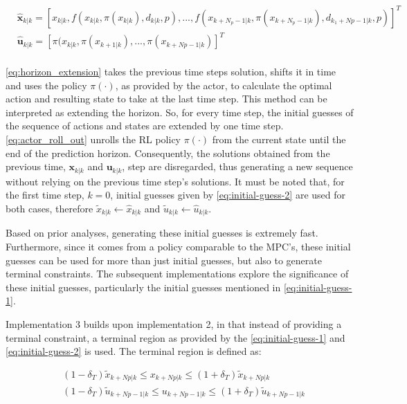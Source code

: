 \begin{equation}\label{eq:actor_roll_out}
	\begin{aligned}
		&\hat{\mathbf{x}}_{k|k} = [x_{k|k},f(x_{k|k},\pi(x_{k|k}),d_{k|k},p),..., f(x_{k+N_p-1|k}, \pi(x_{k + N_p-1|k}), d_{k_1 + Np-1|k},p)]^T \\ 
		&\hat{\mathbf{u}}_{k|k} = [\pi(x_{k|k},\pi(x_{k+1|k}),...,\pi(x_{k+Np-1|k})]^T \\ 
	\end{aligned}
\end{equation}

\autoref{eq:horizon_extension} takes the previous time steps solution, shifts it in time and uses the policy $\pi(\cdot)$, as provided by the actor, to calculate the optimal action and resulting state to take at the last time step. This method can be interpreted as extending the horizon. So, for every time step, the initial guesses of the sequence of actions and states are extended by one time step. \autoref{eq:actor_roll_out} unrolls the RL policy $\pi(\cdot)$ from the current state until the end of the prediction horizon. Consequently, the solutions obtained from the previous time, $\mathbf{x}_{k|k}$ and $\mathbf{u}_{k|k}$, step are disregarded, thus generating a new sequence without relying on the previous time step’s solutions. It must be noted that, for the first time step, $k=0$, initial guesses given by \autoref{eq:initial-guess-2} are used for both cases, therefore $\tilde{x}_{k|k} \leftarrow \hat{x}_{k|k}$ and $\tilde{u}_{k|k} \leftarrow \hat{u}_{k|k}$.

Based on prior analyses, generating these initial guesses is extremely fast. Furthermore, since it comes from a policy comparable to the MPC’s, these initial guesses can be used for more than just initial guesses, but also to generate terminal constraints. The subsequent implementations explore the significance of these initial guesses, particularly the initial guesses mentioned in \autoref{eq:initial-guess-1}.


Implementation 3 builds upon implementation 2, in that instead of providing a terminal constraint, a terminal region as provided by the \autoref{eq:initial-guess-1} and \autoref{eq:initial-guess-2} is used. The terminal region is defined as:

\begin{equation}\label{eq:terminal-region}
	\begin{aligned}
		& (1-\delta_T)\tilde{x}_{k+Np|k} \leq x_{k+Np|k} \leq (1+\delta_T)\tilde{x}_{k+Np|k}\\
		&(1-\delta_T)\tilde{u}_{k+Np-1|k} \leq u_{k+Np-1|k} \leq (1+\delta_T) \tilde{u}_{k+Np-1|k}\\
	\end{aligned}
\end{equation}

